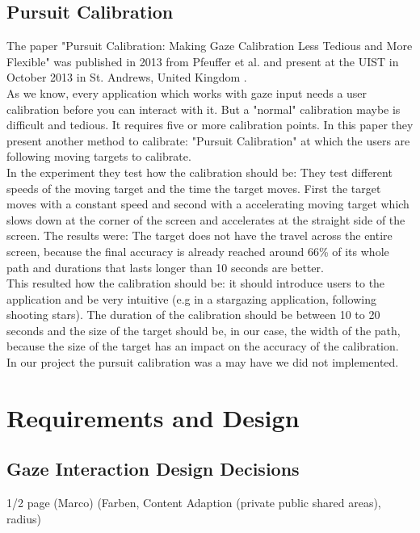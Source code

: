 \documentclass{sigchi}
\begin{document}
\subsection{Pursuit Calibration}
The paper "Pursuit Calibration: Making Gaze Calibration Less Tedious and More Flexible" was published in 2013 from Pfeuffer et al. and present at the UIST in October 2013 in St. Andrews, United Kingdom \cite{pfeuffer2013pursuit}.\\
As we know, every application which works with gaze input needs a user calibration before you can interact with it. But a "normal" calibration maybe is difficult and tedious. It requires five or more calibration points. In this paper they present another method to calibrate: "Pursuit Calibration" at which the users are following moving targets to calibrate.\\
In the experiment they test how the calibration should be: They test different speeds of the moving target and the time the target moves. First the target moves with a constant speed and second with a accelerating moving target which slows down at the corner of the screen and accelerates at the straight side of the screen. The results were: The target does not have the travel across the entire screen, because the final accuracy is already reached around 66\% of its whole path and durations that lasts longer than 10 seconds are better.\\
This resulted how the calibration should be: it should introduce users to the application and be very intuitive (e.g in a stargazing application, following shooting stars). The duration of the calibration should be between 10 to 20 seconds and the size of the target should be, in our case, the width of the path, because the size of the target has an impact on the accuracy of the calibration.\\
In our project the pursuit calibration was a may have we did not implemented.

\section{Requirements and Design}
\subsection{Gaze Interaction Design Decisions}
1/2 page (Marco) (Farben, Content Adaption (private public shared areas), radius)
\end{document}
